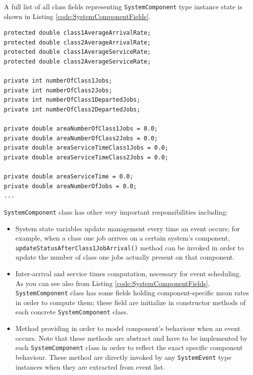 \documentclass[10pt,a4paper]{article}
\begin{document}
A full list of all class fields representing \texttt{SystemComponent} type instance state is shown in Listing \ref{code:SystemComponentFields}.

\begin{lstlisting}[frame=lines, caption={Fields of \texttt{SystemComponent} abstract class.}, label={code:SystemComponentFields}]
protected double class1AverageArrivalRate;
protected double class2AverageArrivalRate;
protected double class1AverageServiceRate;
protected double class2AverageServiceRate;

private int numberOfClass1Jobs;
private int numberOfClass2Jobs;
private int numberOfClass1DepartedJobs;
private int numberOfClass2DepartedJobs;

private double areaNumberOfClass1Jobs = 0.0;
private double areaNumberOfClass2Jobs = 0.0;
private double areaServiceTimeClass1Jobs = 0.0;
private double areaServiceTimeClass2Jobs = 0.0;

private double areaServiceTime = 0.0;
private double areaNumberOfJobs = 0.0;
...
\end{lstlisting}

\texttt{SystemComponent} class has other very important responsibilities including: 
  
\begin{itemize}

\item System state variables update management every time an event occurs; for example, when a class one job arrives on a certain system's component, \texttt{updateStatusAfterClass1JobArrival()} method can be invoked in order to update the number of class one jobs actually present on that component.

\item Inter-arrival and service times computation, necessary for event scheduling. As you can see also from Listing \ref{code:SystemComponentFields}, \texttt{SystemComponent} class has some fields holding component-specific mean rates in order to compute them; these field are initialize in constructor methods of each concrete \texttt{SystemComponent} class.

\item Method providing in order to model component's behaviour when an event occurs. Note that these methods are abstract and have to be implemented by each \texttt{SystemComponent} class in order to reflect the exact specific component behaviour. These method are directly invoked by any \texttt{SystemEvent} type instances when they are extracted from event list.
\end{itemize}
\end{document}
